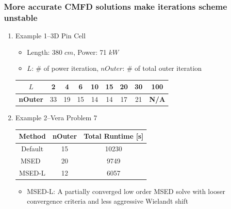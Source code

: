 \begin{frame} \frametitle{More accurate CMFD solutions make iterations scheme unstable}
\begin{enumerate}
    \item Example 1--3D Pin Cell
    \begin{itemize}
        \item Length: 380 $cm$, Power: 71 $kW$
        \vspace{-0.5em}
        \item $L$: $\#$ of power iteration, $nOuter$: $\#$ of total outer iteration
    \end{itemize}
    \begin{table} [!hbt]
    \centering
     \small
    \begin{tabular}{c|c|c|c|c|c|c|c|c} 
        \toprule
        \textbf{$L$}&2 & 4 & 6 & 10 & 15 & 20 &30&100\\ 
         \toprule
       \textbf{nOuter}&33&19&15&14&14&17&21&\textbf{N/A}\\
        \toprule
    \end{tabular}
    \end{table}
    \vspace{-1em}
    \item Example 2--Vera Problem 7
    \begin{table}[ht!]
        \centering
	\begin{tabular}{ccc}
    \toprule
        Method & nOuter & Total Runtime [s]  \\
        \midrule
   			Default & 15 &  10230 \\
  			MSED~\footfullcite{yee2019multilevel} & 20 &  9749 \\
  			MSED-L&  12  & 6057 \\
        \bottomrule
    \end{tabular}
    \begin{itemize}
        \item MSED-L:  A partially converged low order MSED solve with looser convergence criteria and less aggressive Wielandt shift
    \end{itemize}
\end{table}  
\end{enumerate}
\end{frame}
